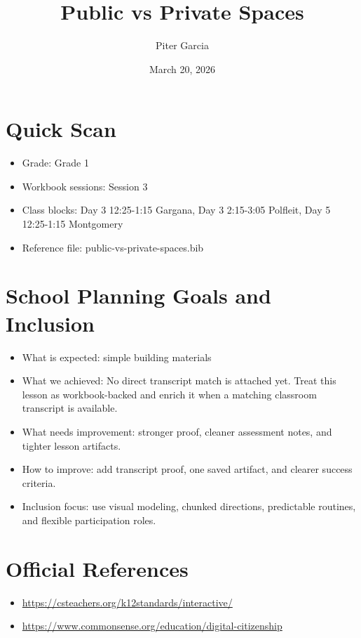 \documentclass[11pt]{article}
\title{Public vs Private Spaces}
\author{Piter Garcia}
\date{March 20, 2026}
\begin{document}
    \maketitle
    \section*{Quick Scan}
    \begin{itemize}[leftmargin=*]
    \item Grade: Grade 1
    \item Workbook sessions: Session 3
    \item Class blocks: Day 3 12:25-1:15 Gargana, Day 3 2:15-3:05 Polfleit, Day 5 12:25-1:15 Montgomery
    \item Reference file: public-vs-private-spaces.bib
    \end{itemize}
    \section*{School Planning Goals and Inclusion}
    \begin{itemize}[leftmargin=*]
    \item What is expected: simple building materials
    \item What we achieved: No direct transcript match is attached yet. Treat this lesson as workbook-backed and enrich it when a matching classroom transcript is available.
    \item What needs improvement: stronger proof, cleaner assessment notes, and tighter lesson artifacts.
    \item How to improve: add transcript proof, one saved artifact, and clearer success criteria.
    \item Inclusion focus: use visual modeling, chunked directions, predictable routines, and flexible participation roles.
    \end{itemize}
    \section*{Official References}
    \begin{itemize}[leftmargin=*]
    \item \url{https://csteachers.org/k12standards/interactive/}
\item \url{https://www.commonsense.org/education/digital-citizenship}

    \end{itemize}
    
\end{document}
